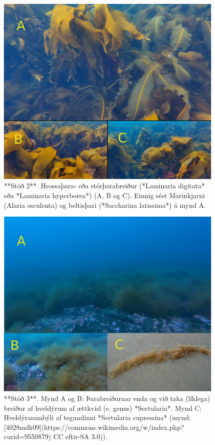 \documentclass[icelandic,]{book}
\begin{document}
\begin{figure}

{\centering \includegraphics[width=1\linewidth]{skjol/skogar/sk3/stodvar/st2/samsett} 

}

\caption{**Stöð 2**. Hrossaþara- eða stórþarabreiður (*Laminaria digitata* eða *Laminaria hyperborea*) (A, B og C). Einnig sést Marinkjarni (Alaria esculenta) og beltisþari (*Saccharina latissima*) á mynd A.}\label{fig:mynd-sk-thrju-stod-tvo}
\end{figure}

\begin{figure}

{\centering \includegraphics[width=1\linewidth]{skjol/skogar/sk3/stodvar/st3/samsett} 

}

\caption{**Stöð 3**. Mynd A og B: Þarabreiðurnar enda og við taka (líklega) breiður af hveldýrum af ættkvísl (e. genus) *Sertularia*. Mynd C: Hveldýrasambýli af tegundinni *Sertularia cupressina* (mynd: [4028mdk09](https://commons.wikimedia.org/w/index.php?curid=9550879) CC eftir-SA 3.0)).}\label{fig:mynd-sk-thrju-stod-thrju-hydrur}
\end{figure}
\end{document}
